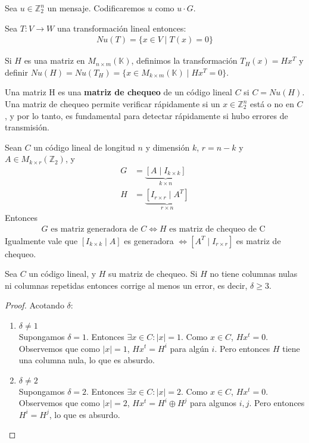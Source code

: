 \begin{definition}
Sea $u \in \mathbb{Z}_2^n$ un mensaje. Codificaremos $u$ como $u \cdot G$.
\end{definition}

\begin{proposition}
Sea $T \colon V \to W$ una transformación lineal entonces:
\begin{align}
    Nu(T) = \{x \in V \mid T(x) = 0\}
\end{align}
\end{proposition}
Si $H$ es una matriz en $M_{n \times m}(\mathbb{K})$, definimos la transformación $T_H(x) = H x^T$ y definir $Nu(H) = Nu(T_H) = \{x \in M_{k \times m}(\mathbb{K}) \mid H x^T = 0\}$.

\begin{definition}
Una matriz H es una \textbf{matriz de chequeo} de un código lineal $C$ si $C = Nu(H)$.\\
Una matriz de chequeo permite verificar rápidamente si un $x \in \mathbb{Z}_2^n$ está o no en $C$, y por lo tanto, es fundamental para detectar rápidamente si hubo errores de transmisión.
\end{definition}

\begin{theorem}
Sean $C$ un código lineal de longitud $n$ y dimensión $k$, $r = n-k$ y $A \in M_{k \times r}(\mathbb{Z}_2)$, y
\begin{align}
    G &= \underbrace{[A \mid I_{k\times k} ]}_{k\times n}\\
    H &= \underbrace{[I_{r\times r} \mid A^T]}_{r \times n}
\end{align}
Entonces
\begin{align}
    G \text{ es matriz generadora de } C \iff H \text{ es matriz de chequeo de C }
\end{align}
Igualmente vale que $[I_{k\times k} \mid A]$ es generadora $\iff [A^T \mid I_{r\times r}]$ es matriz de chequeo.
\end{theorem}

\begin{proposition}
Sea $C$ un código lineal, y $H$ su matriz de chequeo. Si $H$ no tiene columnas nulas ni columnas repetidas entonces corrige al menos un error, es decir, $\delta \ge 3$.
\end{proposition}
\begin{proof}
Acotando $\delta$:
\begin{enumerate}
    \item $\delta \neq 1$\\
    Supongamos $\delta = 1$. Entonces $\exists x \in C : \left| x \right| = 1$. Como $x \in C$, $Hx^t = 0$. Observemos que como $\left| x \right| = 1$, $Hx^t = H^i$ para algún $i$. Pero entonces $H$ tiene una columna nula, lo que es absurdo.
    \item $\delta \neq 2$\\
    Supongamos $\delta = 2$. Entonces $\exists x \in C : \left| x \right| = 2$. Como $x \in C$, $Hx^t = 0$. Observemos que como $\left| x \right| = 2$, $Hx^t = H^i \oplus H^j$ para algunos $i,j$. Pero entonces $H^i = H^j$, lo que es absurdo.
\end{enumerate}
\end{proof}


